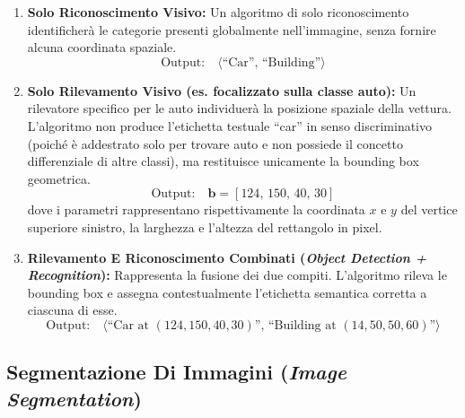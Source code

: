 ﻿\documentclass[11pt, a4paper]{article}
\begin{document}
\begin{enumerate}
    \item \textbf{Solo Riconoscimento Visivo:}
    Un algoritmo di solo riconoscimento identificherà le categorie presenti globalmente nell'immagine, senza fornire alcuna coordinata spaziale.
    \[
    \text{Output:} \quad \langle \text{``Car''}, \, \text{``Building''} \rangle
    \]


    \item \textbf{Solo Rilevamento Visivo (es. focalizzato sulla classe auto):}
    Un rilevatore specifico per le auto individuerà la posizione spaziale della vettura. L'algoritmo non produce l'etichetta testuale ``car'' in senso discriminativo (poiché è addestrato solo per trovare auto e non possiede il concetto differenziale di altre classi), ma restituisce unicamente la bounding box geometrica.
    \[
    \text{Output:} \quad \bm{b} = [124, \, 150, \, 40, \, 30]
    \]
    dove i parametri rappresentano rispettivamente la coordinata $x$ e $y$ del vertice superiore sinistro, la larghezza e l'altezza del rettangolo in pixel.


    \item \textbf{Rilevamento E Riconoscimento Combinati (\emph{Object Detection + Recognition}):}
    Rappresenta la fusione dei due compiti. L'algoritmo rileva le bounding box e assegna contestualmente l'etichetta semantica corretta a ciascuna di esse.
    \[
    \text{Output:} \quad \langle \text{``Car at } (124, 150, 40, 30)\text{''}, \, \text{``Building at } (14, 50, 50, 60)\text{''} \rangle
    \]

\end{enumerate}

\subsection{Segmentazione Di Immagini (\emph{Image Segmentation})}
\end{document}
